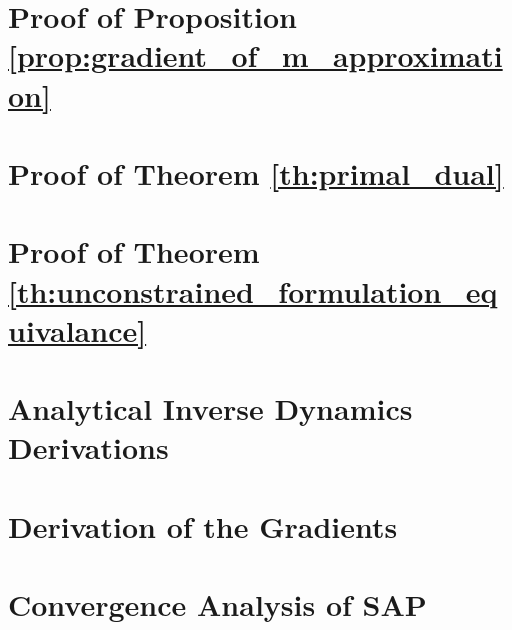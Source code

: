 \section{Proof of Proposition \ref{prop:gradient_of_m_approximation}}
\label{app:gradient_of_m_approximation}


\section{Proof of Theorem \ref{th:primal_dual}}
\label{app:primal_dual_proof}


\section{Proof of Theorem \ref{th:unconstrained_formulation_equivalance}}
\label{app:unconstrained_formulation_equivalance}


\section{Analytical Inverse Dynamics Derivations}
\label{app:analytical_inverse_dynamics_derivations}


\section{Derivation of the Gradients}
\label{app:gradients_derivation}


\section{Convergence Analysis of SAP}
\label{app:sap_converge}


